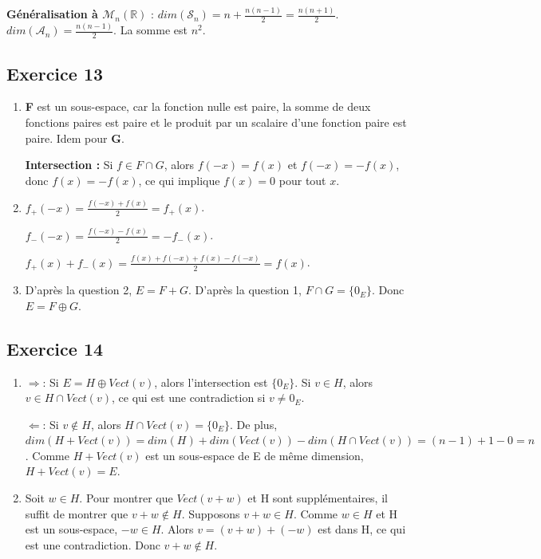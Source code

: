 \documentclass[french]{yLectureNote}
\begin{document}
\textbf{Généralisation à $\mathcal{M}_n(\mathbb{R})$} : $dim(\mathcal{S}_n) = n+\frac{n(n-1)}{2}=\frac{n(n+1)}{2}$. $dim(\mathcal{A}_n) = \frac{n(n-1)}{2}$. La somme est $n^2$.

\subsection{Exercice 13}
\begin{enumerate}
    \item \textbf{F} est un sous-espace, car la fonction nulle est paire, la somme de deux fonctions paires est paire et le produit par un scalaire d'une fonction paire est paire. Idem pour \textbf{G}.

    \textbf{Intersection :} Si $f\in F\cap G$, alors $f(-x)=f(x)$ et $f(-x)=-f(x)$, donc $f(x)=-f(x)$, ce qui implique $f(x)=0$ pour tout $x$.
    \item $f_{+}(-x)=\frac{f(-x)+f(x)}{2}=f_{+}(x)$.

    $f_{-}(-x)=\frac{f(-x)-f(x)}{2}=-f_{-}(x)$.

    $f_{+}(x)+f_{-}(x)=\frac{f(x)+f(-x)+f(x)-f(-x)}{2}=f(x)$.

    \item D'après la question 2, $E=F+G$. D'après la question 1, $F\cap G=\{0_E\}$. Donc $E=F\oplus G$.
\end{enumerate}

\subsection{Exercice 14}
\begin{enumerate}
    \item $\Rightarrow$: Si $E=H\oplus Vect(v)$, alors l'intersection est $\{0_E\}$. Si $v\in H$, alors $v\in H\cap Vect(v)$, ce qui est une contradiction si $v\ne0_E$.

    $\Leftarrow$: Si $v\notin H$, alors $H\cap Vect(v)=\{0_E\}$. De plus, $dim(H+Vect(v))=dim(H)+dim(Vect(v))-dim(H\cap Vect(v))=(n-1)+1-0=n$. Comme $H+Vect(v)$ est un sous-espace de E de même dimension, $H+Vect(v)=E$.
    \item Soit $w\in H$. Pour montrer que $Vect(v+w)$ et H sont supplémentaires, il suffit de montrer que $v+w\notin H$. Supposons $v+w\in H$. Comme $w\in H$ et H est un sous-espace, $-w\in H$. Alors $v=(v+w)+(-w)$ est dans H, ce qui est une contradiction. Donc $v+w\notin H$.

\end{enumerate}
\end{document}
